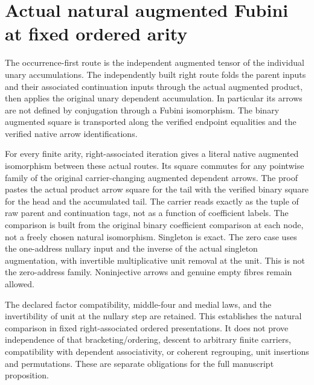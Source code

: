 \documentclass{article}
\begin{document}
\section*{Actual natural augmented Fubini at fixed ordered arity}
The occurrence-first route is the independent augmented tensor of
the individual unary accumulations. The independently built right
route folds the parent inputs and their associated continuation
inputs through the actual augmented product, then applies the
original unary dependent accumulation. In particular its arrows
are not defined by conjugation through a Fubini isomorphism.
The binary augmented square is transported along the verified
endpoint equalities and the verified native arrow identifications.

For every finite arity, right-associated iteration gives a literal
native augmented isomorphism between these actual routes. Its
square commutes for any pointwise family of the original
carrier-changing augmented dependent arrows. The proof pastes
the actual product arrow square for the tail with the verified
binary square for the head and the accumulated tail. The carrier
reads exactly as the tuple of raw parent and continuation tags,
not as a function of coefficient labels. The comparison is
built from the original binary coefficient comparison at each
node, not a freely chosen natural isomorphism. Singleton is exact.
The zero case uses the one-address nullary input and the inverse
of the actual singleton augmentation, with invertible
multiplicative unit removal at the unit. This is not the zero-address
family. Noninjective arrows and genuine empty fibres remain allowed.

The declared factor compatibility, middle-four and medial laws,
and the invertibility of unit at the nullary step are retained.
This establishes the natural comparison in fixed right-associated
ordered presentations. It does not prove independence of that
bracketing/ordering, descent to arbitrary finite carriers,
compatibility with dependent associativity, or coherent
regrouping, unit insertions and permutations. These are separate
obligations for the full manuscript proposition.
\end{document}
